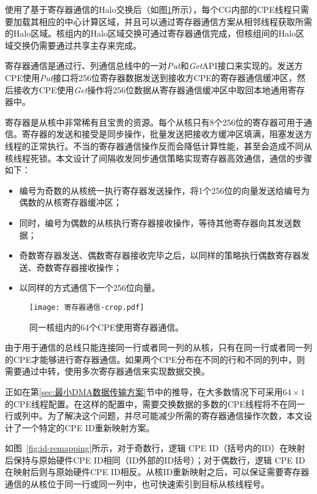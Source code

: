 使用了基于寄存器通信的Halo交换后（如图\ref{fig:64by1-reg}所示），每个CG内部的CPE线程只需要加载其相应的中心计算区域，并且可以通过寄存器通信方案从相邻线程获取所需的Halo区域。核组内的Halo区域交换可通过寄存器通信完成，但核组间的Halo区域交换仍需要通过共享主存来完成。

寄存器通信是通过行、列通信总线中的一对\emph{Put}和\emph{Get}API接口来实现的。发送方CPE使用\emph {Put}接口将256位寄存器数据发送到接收方CPE的寄存器通信缓冲区，然后接收方CPE使用\emph{Get}操作将256位数据从寄存器通信缓冲区中取回本地通用寄存器中。

寄存器是从核中非常稀有且宝贵的资源。每个从核只有8个256位的寄存器可用于通信。寄存器的发送和接受是同步操作，批量发送把接收方缓冲区填满，阻塞发送方线程的正常执行。不当的寄存器通信操作反而会降低计算性能，甚至会造成不同从核线程死锁。本文设计了间隔收发同步通信策略实现寄存器高效通信，通信的步骤如下：
\begin{itemize}
  \item 编号为奇数的从核统一执行寄存器发送操作，将1个256位的向量发送给编号为偶数的从核寄存器缓冲区；
  \item 同时，编号为偶数的从核执行寄存器接收操作，等待其他寄存器向其发送数据；
  \item 奇数寄存器发送、偶数寄存器接收完毕之后，以同样的策略执行偶数寄存器发送、奇数寄存器接收操作；
  \item 以同样的方式通信下一个256位向量。
\end{itemize}

\begin{figure}[ht]
\centering
\texttt{[image: 寄存器通信-crop.pdf]}
\caption{同一核组内的64个CPE使用寄存器通信。}
\label{fig:64by1-reg}
\end{figure}

由于用于通信的总线只能连接同一行或者同一列的从核，只有在同一行或者同一列的CPE才能够进行寄存器通信。如果两个CPE分布在不同的行和不同的列中，则需要通过中转，使用多次寄存器通信来实现数据交换。

正如在第\ref{sec:最小DMA数据传输方案}节中的推导，在大多数情况下可采用$ 64 \times1 $的CPE线程配置。在这样的配置中，需要交换数据的多数的CPE线程将不在同一行或列中。为了解决这个问题，并尽可能减少所需的寄存器通信操作次数，本文设计了一个特定的CPE ID重新映射方案。

如图~\ref{fig:id-remapping}所示，对于奇数行，逻辑 CPE ID（括号内的ID）在映射后保持与原始硬件CPE ID相同（ID外部的ID括号）；对于偶数行，逻辑 CPE ID在映射后则与原始硬件CPE ID相反。从核ID重新映射之后，可以保证需要寄存器通信的从核位于同一行或同一列中，也可快速索引到目标从核线程号。

